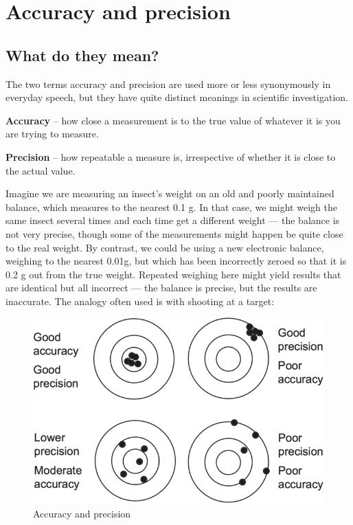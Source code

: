 \documentclass[
]{book}
\begin{document}
\hypertarget{accuracy-precision}{%
\section{Accuracy and precision}\label{accuracy-precision}}

\hypertarget{what-do-they-mean}{%
\subsection{What do they mean?}\label{what-do-they-mean}}

The two terms accuracy and precision are used more or less synonymously in everyday speech, but they have quite distinct meanings in scientific investigation.

\textbf{Accuracy} -- how close a measurement is to the true value of whatever it is you are trying to measure.

\textbf{Precision} -- how repeatable a measure is, irrespective of whether it is close to the actual value.

Imagine we are measuring an insect's weight on an old and poorly maintained balance, which measures to the nearest 0.1 g. In that case, we might weigh the same insect several times and each time get a different weight --- the balance is not very precise, though some of the measurements might happen be quite close to the real weight. By contrast, we could be using a new electronic balance, weighing to the nearest 0.01g, but which has been incorrectly zeroed so that it is 0.2 g out from the true weight. Repeated weighing here might yield results that are identical but all incorrect --- the balance is precise, but the results are inaccurate. The analogy often used is with shooting at a target:

\begin{figure}

{\centering \includegraphics[width=0.6\linewidth]{images/targets} 

}

\caption{Accuracy and precision}\label{fig:targets}
\end{figure}
\end{document}
